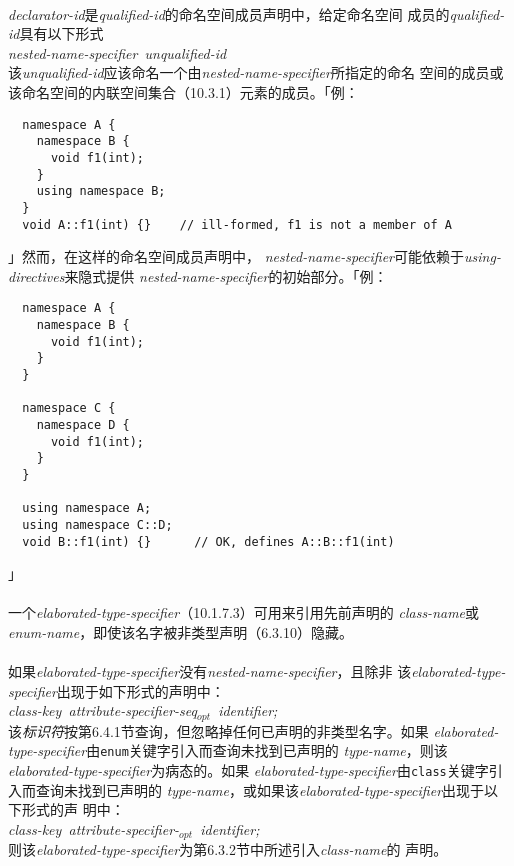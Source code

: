 \paragraph{}
\textit{declarator-id}是\textit{qualified-id}的命名空间成员声明中，给定命名空间
成员的\textit{qualified-id}具有以下形式 \\
\mbox{\qquad \textit{nested-name-specifier unqualified-id}} \\
该\textit{unqualified-id}应该命名一个由\textit{nested-name-specifier}所指定的命名
空间的成员或该命名空间的内联空间集合（10.3.1）元素的成员。「例：
\begin{lstlisting}
  namespace A {
    namespace B {
      void f1(int);
    }
    using namespace B;
  }
  void A::f1(int) {}    // ill-formed, f1 is not a member of A
\end{lstlisting}」然而，在这样的命名空间成员声明中，
\textit{nested-name-specifier}可能依赖于\textit{using-directives}来隐式提供
\textit{nested-name-specifier}的初始部分。「例：
\begin{lstlisting}
  namespace A {
    namespace B {
      void f1(int);
    }
  }

  namespace C {
    namespace D {
      void f1(int);
    }
  }

  using namespace A;
  using namespace C::D;
  void B::f1(int) {}      // OK, defines A::B::f1(int)
\end{lstlisting}」

\paragraph{}
一个\textit{elaborated-type-specifier}（10.1.7.3）可用来引用先前声明的
\textit{class-name}或\textit{enum-name}，即使该名字被非类型声明（6.3.10）隐藏。

\paragraph{}
如果\textit{elaborated-type-specifier}没有\textit{nested-name-specifier}，且除非
该\textit{elaborated-type-specifier}出现于如下形式的声明中：\\
\mbox{\qquad \textit{class-key attribute-specifier-seq$_{opt}$ identifier;}} \\
该\textit{标识符}按第6.4.1节查询，但忽略掉任何已声明的非类型名字。如果
\textit{elaborated-type-specifier}由\texttt{enum}关键字引入而查询未找到已声明的
\textit{type-name}，则该\textit{elaborated-type-specifier}为病态的。如果
\textit{elaborated-type-specifier}由\texttt{class}关键字引入而查询未找到已声明的
\textit{type-name}，或如果该\textit{elaborated-type-specifier}出现于以下形式的声
明中： \\
\mbox{\qquad \textit{class-key attribute-specifier-$_{opt}$ identifier;}} \\
则该\textit{elaborated-type-specifier}为第6.3.2节中所述引入\textit{class-name}的
声明。

